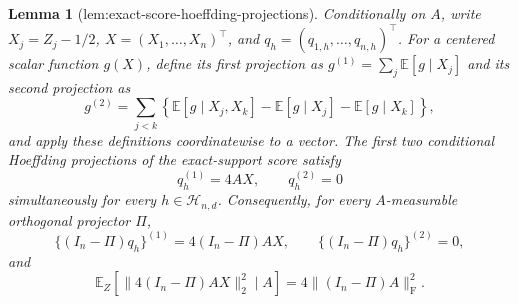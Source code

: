 \documentclass{article}
\newtheorem{lemma}{Lemma}
\begin{document}
\begin{lemma}[lem:exact-score-hoeffding-projections]\label{lem:exact-score-hoeffding-projections}
Conditionally on \(A\), write \(X_j=Z_j-1/2\), \(X=(X_1,\ldots,X_n)^\top\), and \(q_h=(q_{1,h},\ldots,q_{n,h})^\top\).  For a centered scalar function \(g(X)\), define its first projection as \(g^{(1)}=\sum_j\mathbb E[g\mid X_j]\) and its second projection as
\[
 g^{(2)}=\sum_{j<k}\left\{\mathbb E[g\mid X_j,X_k]
 -\mathbb E[g\mid X_j]-\mathbb E[g\mid X_k]\right\},
\]
and apply these definitions coordinatewise to a vector.  The first two conditional Hoeffding projections of the exact-support score satisfy
\[
 q_h^{(1)}=4AX,\qquad q_h^{(2)}=0
\]
simultaneously for every \(h\in\mathcal H_{n,d}\).  Consequently, for every \(A\)-measurable orthogonal projector \(\Pi\),
\[
 \{(I_n-\Pi)q_h\}^{(1)}=4(I_n-\Pi)AX,
 \qquad \{(I_n-\Pi)q_h\}^{(2)}=0,
\]
and
\[
 \mathbb E_Z\!\left[\|4(I_n-\Pi)AX\|_2^2\mid A\right]
 =4\|(I_n-\Pi)A\|_{\mathrm F}^2.
\]
\end{lemma}
\end{document}
